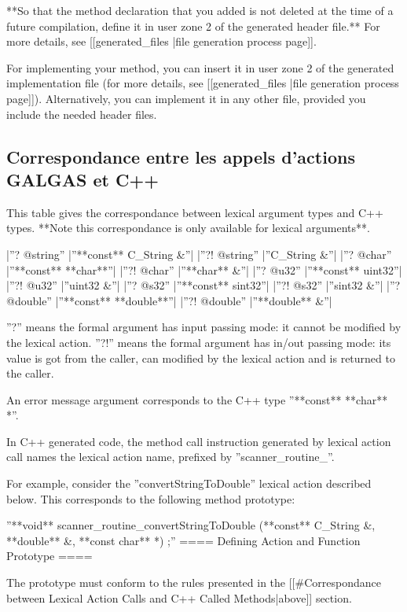 **So that the method declaration that you added is not deleted at the time of a future compilation, define it in user zone 2 of the generated header file.** For more details, see [[generated\_files |file generation process page]].

For implementing your method, you can insert it in user zone 2 of the generated implementation file (for more details, see [[generated\_files |file generation process page]]). Alternatively, you can implement it in any other file, provided you include the needed header files.

\subsection{Correspondance entre les appels d'actions GALGAS et C++}

This table gives the correspondance between lexical argument types and C++ types. **Note this correspondance is only available for lexical arguments**.

|''? @string''  |''**const** C\_String \&''|
|''?! @string''  |''C\_String \&''|
|''? @char''  |''**const** **char**''|
|''?! @char''  |''**char** \&''|
|''? @u32''  |''**const** uint32''|
|''?! @u32''  |''uint32 \&''|
|''? @s32''  |''**const** sint32''|
|''?! @s32''  |''sint32 \&''|
|''? @double''  |''**const** **double**''|
|''?! @double''  |''**double** \&''|

''?'' means the formal argument has input passing mode: it cannot be modified by the lexical action. ''?!'' means the formal argument has in/out passing mode: its value is got from the caller, can modified by the lexical action and is returned to the caller.

An error message argument corresponds to the C++ type ''**const** **char** *''.

In C++ generated code, the method call instruction generated by lexical action call names the lexical action name, prefixed by ''scanner\_routine\_''.

For example, consider the ''convertStringToDouble'' lexical action described below. This corresponds to the following method prototype:

''**void** scanner\_routine\_convertStringToDouble (**const** C\_String \&, **double** \&, **const char** *) ;''
==== Defining Action and Function Prototype ====

The prototype must conform to the rules presented in the [[\#Correspondance between Lexical Action Calls and C++ Called Methods|above]] section.

